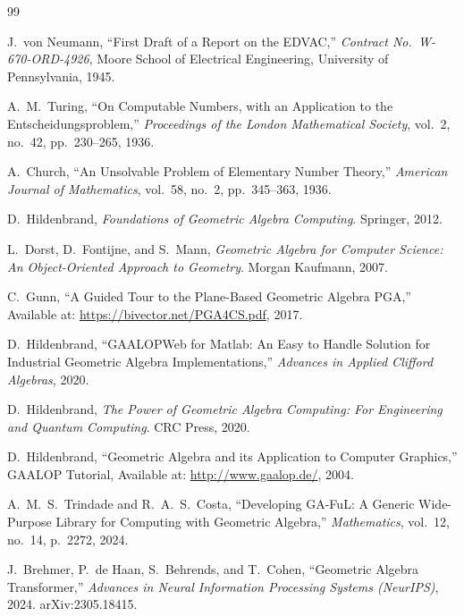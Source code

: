 \documentclass[manuscript, nonacm, review=false]{acmart}
\theoremstyle{definition}
\theoremstyle{plain}
\begin{document}

\begin{thebibliography}{99}

J.~von Neumann, ``First Draft of a Report on the EDVAC,'' \emph{Contract No.\ W-670-ORD-4926}, Moore School of Electrical Engineering, University of Pennsylvania, 1945.

A.~M.~Turing, ``On Computable Numbers, with an Application to the Entscheidungsproblem,'' \emph{Proceedings of the London Mathematical Society}, vol.~2, no.~42, pp.~230--265, 1936.

A.~Church, ``An Unsolvable Problem of Elementary Number Theory,'' \emph{American Journal of Mathematics}, vol.~58, no.~2, pp.~345--363, 1936.

D.~Hildenbrand, \emph{Foundations of Geometric Algebra Computing}. Springer, 2012.

L.~Dorst, D.~Fontijne, and S.~Mann, \emph{Geometric Algebra for Computer Science: An Object-Oriented Approach to Geometry}. Morgan Kaufmann, 2007.

C.~Gunn, ``A Guided Tour to the Plane-Based Geometric Algebra PGA,'' Available at: \url{https://bivector.net/PGA4CS.pdf}, 2017.

D.~Hildenbrand, ``GAALOPWeb for Matlab: An Easy to Handle Solution for Industrial Geometric Algebra Implementations,'' \emph{Advances in Applied Clifford Algebras}, 2020.

D.~Hildenbrand, \emph{The Power of Geometric Algebra Computing: For Engineering and Quantum Computing}. CRC Press, 2020.

D.~Hildenbrand, ``Geometric Algebra and its Application to Computer Graphics,'' GAALOP Tutorial, Available at: \url{http://www.gaalop.de/}, 2004.

A.~M.~S.~Trindade and R.~A.~S.~Costa, ``Developing GA-FuL: A Generic Wide-Purpose Library for Computing with Geometric Algebra,'' \emph{Mathematics}, vol.~12, no.~14, p.~2272, 2024.

J.~Brehmer, P.~de Haan, S.~Behrends, and T.~Cohen, ``Geometric Algebra Transformer,'' \emph{Advances in Neural Information Processing Systems (NeurIPS)}, 2024. arXiv:2305.18415.


\end{thebibliography}
\end{document}
